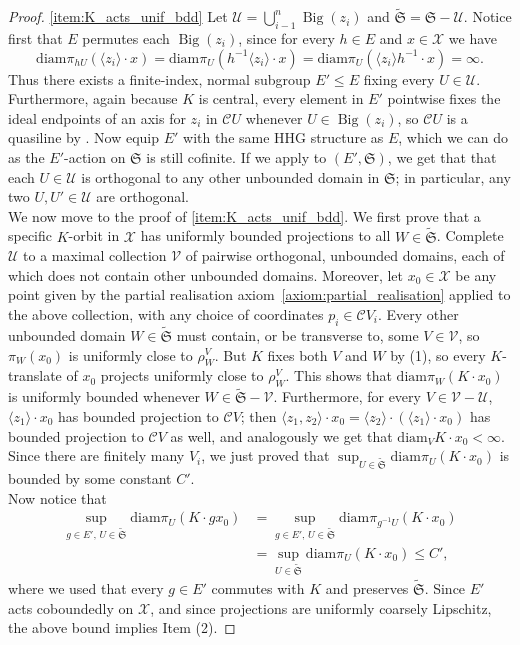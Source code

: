 \documentclass[svgnames]{amsart}
\theoremstyle{plain}
\theoremstyle{definition}
\newcommand{\cal}[1]{\mathcal{#1}}
\newcommand{\frakS}{\mathfrak{S}}
\newcommand{\C}{\cal C}
\newcommand{\Bigdom}[1]{\operatorname{Big}\left(#1\right)}
\newcommand{\diam}{\mathrm{diam}}
\newcommand{\wfS}{\widetilde{\frakS}}
\begin{document}
\begin{proof}
    \eqref{item:K_acts_unif_bdd} Let $\cal U=\bigcup_{i-1}^n \Bigdom{z_i}$ and $\wfS=\frakS-\cal U$. Notice first that $E$ permutes each $\Bigdom{z_i}$, since for every $h\in E$ and $x\in \cal X$ we have
    $$\diam\pi_{hU}(\langle z_i\rangle\cdot x)=\diam\pi_{U}(h^{-1}\langle z_i\rangle\cdot x)=\diam\pi_{U}(\langle z_i\rangle h^{-1}\cdot x)=\infty.$$
    Thus there exists a finite-index, normal subgroup $E'\le E$ fixing every $U\in \cal U$. Furthermore, again because $K$ is central, every element in $E'$ pointwise fixes the ideal endpoints of an axis for $z_i$ in $\C U$ whenever $U\in \Bigdom{z_i}$, so $\C U$ is a quasiline by \cite[Proposition 3.3]{ANS:UEG}. Now equip $E'$ with the same HHG structure as $E$, which we can do as the $E'$-action on $\frakS$ is still cofinite. If we apply \cite[Lemma 3.1, Proposition 3.2, and Proposition 3.4]{ANS:UEG} to $(E',\frakS)$, we get that that each $U\in \cal U$ is orthogonal to any other unbounded domain in $\frakS$; in particular, any two $U,U'\in \cal U$ are orthogonal. 
    \\
     We now move to the proof of \eqref{item:K_acts_unif_bdd}. We first prove that a specific $K$-orbit in $\cal X$ has uniformly bounded projections to all $W\in \wfS$. Complete $\cal U$ to a maximal collection $\cal V$ of pairwise orthogonal, unbounded domains, each of which does not contain other unbounded domains. Moreover, let $x_0\in \cal X$ be any point given by the partial realisation axiom~\ref{axiom:partial_realisation} applied to the above collection, with any choice of coordinates $p_i\in\C V_i$. Every other unbounded domain $W\in \wfS$ must contain, or be transverse to, some $V\in \cal V$, so $\pi_W(x_0)$ is uniformly close to $\rho^{V}_W$. But $K$ fixes both $V$ and $W$ by (1), so every $K$-translate of $x_0$ projects uniformly close to $\rho^{V}_W$. This shows that $\diam\pi_W(K\cdot x_0)$ is uniformly bounded whenever $W\in \wfS-\cal V$. Furthermore, for every $V\in \cal V-\cal U$, $\langle z_1\rangle\cdot x_0$ has bounded projection to $\C V$; then $\langle z_1, z_2\rangle\cdot x_0=\langle z_2\rangle\cdot (\langle z_1\rangle\cdot x_0)$ has bounded projection to $\C V$ as well, and analogously we get that $\diam_V K\cdot x_0<\infty$. Since there are finitely many $V_i$, we just proved that $\sup_{U\in \wfS}\diam\pi_U(K\cdot x_0)$ is bounded by some constant $C'$.
     \\
    Now notice that
    \begin{align*}
        \sup_{g\in E',\, U\in \wfS}\diam\pi_U(K\cdot gx_0)&=\sup_{g\in E',\, U\in \wfS}\diam\pi_{g^{-1}U}(K\cdot x_0)\\
        &=\sup_{U\in \wfS}\diam\pi_U(K\cdot x_0)\le C',
    \end{align*}
    where we used that every $g\in E'$ commutes with $K$ and preserves $\wfS$. Since $E'$ acts coboundedly on $\cal X$, and since projections are uniformly coarsely Lipschitz, the above bound implies Item (2).
\end{proof}
\end{document}
